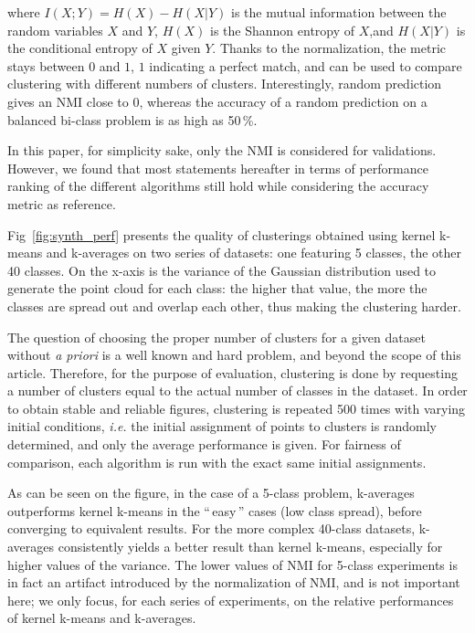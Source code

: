 \documentclass[10pt,letterpaper]{article}
\newcommand{\gl}[1]{``\,#1\,''} %
\begin{document}
where $I(X;Y)=H(X)−H(X|Y)$ is the mutual information between the random variables $X$ and $Y$, $H(X)$ is the Shannon entropy of $X$,and $H(X|Y)$ is the conditional entropy of $X$ given $Y$. Thanks to the normalization, the metric stays between $0$ and $1$, $1$ indicating a perfect match, and can be used to compare clustering with different numbers of clusters. Interestingly, random prediction gives an NMI close to $0$, whereas the accuracy of a random prediction on a balanced bi-class problem is as high as 50\,\%.

In this paper, for simplicity sake, only the NMI is considered for validations. However, we found that most statements hereafter in terms of performance ranking of the different algorithms still hold while considering the accuracy metric as reference.

Fig~\ref{fig:synth_perf} presents the quality of clusterings obtained using kernel k-means and k-averages on two series of datasets: one featuring 5 classes, the other 40 classes. On the x-axis is the variance of the Gaussian distribution used to generate the point cloud for each class: the higher that value, the more the classes are spread out and overlap each other, thus making the clustering harder.

The question of choosing the proper number of clusters for a given dataset without \textit{a priori} is a well known and hard problem, and beyond the scope of this article. Therefore, for the purpose of evaluation, clustering is done by requesting a number of clusters equal to the actual number of classes in the dataset. In order to obtain stable and reliable figures, clustering is repeated 500 times with varying initial conditions, \textit{i.e.} the initial assignment of points to clusters is randomly determined, and only the average performance is given. For fairness of comparison, each algorithm is run with the exact same initial assignments.

As can be seen on the figure, in the case of a 5-class problem, k-averages outperforms kernel k-means in the \gl{easy} cases (low class spread), before converging to equivalent results. For the more complex 40-class datasets, k-averages consistently yields a better result than kernel k-means, especially for higher values of the variance. The lower values of NMI for 5-class experiments is in fact an artifact introduced by the normalization of NMI, and is not important here; we only focus, for each series of experiments, on the relative performances of kernel k-means and k-averages.
\end{document}
